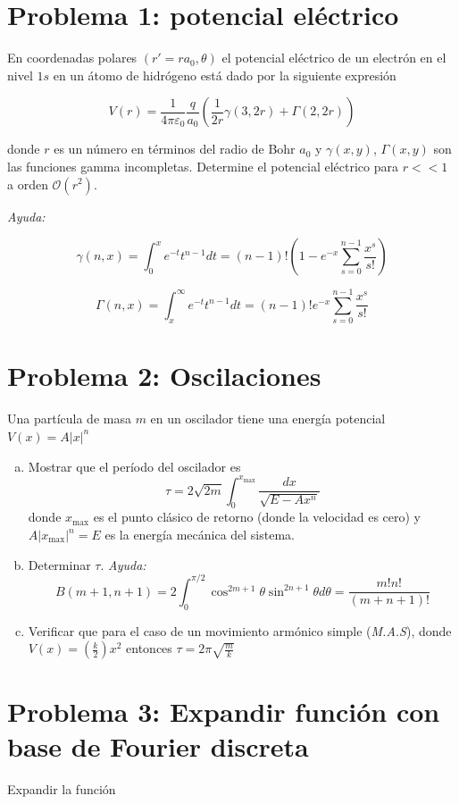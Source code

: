 \documentclass[a4paper]{article}
\begin{document}
\section{Problema 1: potencial eléctrico}
En coordenadas polares $(r'=ra_0,\theta)$ el potencial eléctrico de un electrón en el nivel $1s$ en un átomo de hidrógeno está dado por la siguiente expresión

$$V(r) = \frac{1}{4\pi\varepsilon_0}\frac{q}{a_0}\left(\frac{1}{2r} \gamma(3,2r) + \Gamma(2,2r)\right)$$ 

donde $r$ es un número en términos del radio de Bohr $a_0$ y $\gamma(x, y)$, $\Gamma(x, y)$ son las funciones gamma incompletas. Determine el potencial eléctrico para $r<<1$ a orden $\mathcal{O}(r^2)$.

\textit{Ayuda:}

$$\gamma(n, x) = \int_{0}^{x}e^{-t}t^{n-1}dt = (n-1)!\left(1-e^{-x}\sum_{s=0}^{n-1} \frac{x^s}{s!}\right)$$

$$\Gamma(n, x) = \int_{x}^{\infty}e^{-t}t^{n-1}dt = (n-1)!e^{-x}\sum_{s=0}^{n-1} \frac{x^s}{s!}$$

\section{Problema 2: Oscilaciones}

Una partícula de masa $m$ en un oscilador tiene una energía potencial $V(x)=A|x|^n$

\begin{enumerate}[a.]
	\item Mostrar que el período del oscilador es $$\tau = 2\sqrt{2m}\int_{0}^{x_{\text{max}}}\frac{dx}{\sqrt{E-Ax^n}}$$ donde $x_{\text{max}}$ es el punto clásico de retorno (donde la velocidad es cero) y $A|x_{\text{max}}|^n=E$ es la energía mecánica del sistema.
	\item Determinar $\tau$. \textit{Ayuda:} $$B(m+1,n+1) = 2\int_{0}^{\pi/2} \cos^{2m+1}\theta \sin^{2n+1}\theta d\theta=\frac{m!n!}{(m+n+1)!}$$
	\item Verificar que para el caso de un movimiento armónico simple (\textit{M.A.S}), donde $V(x) = \left(\frac{k}{2}\right)x^2$ entonces $\tau = 2\pi \sqrt{\frac{m}{k}}$
\end{enumerate}

\section{Problema 3: Expandir función con base de Fourier discreta}
Expandir la función 
\end{document}
